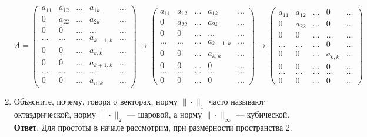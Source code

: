 \documentclass{article}
\begin{document}
\begin{enumerate}
	
	\[
	A = \begin{pmatrix}
		a_{11} & a_{12} & \ldots & a_{1k} & \ldots \\
		0 & a_{22} & \ldots & a_{2k} & \ldots \\
		0 & 0 & \ldots & \ldots & \ldots \\
		\ldots & \ldots & \ldots & a_{k-1,k} & \ldots \\
		0 & 0 &  \ldots & a_{k,k} & \ldots \\
		0 & 0 & \ldots & a_{k+1, k} & \ldots \\
		\ldots & \ldots & \ldots & \ldots & \ldots \\
		0 & 0 & \ldots & a_{n,k} & \ldots
	\end{pmatrix}
	\rightarrow
	\begin{pmatrix}
		a_{11} & a_{12} & \ldots & a_{1k} & \ldots \\
		0 & a_{22} & \ldots & a_{2k} & \ldots \\
		0 & 0 & \ldots & \ldots & \ldots \\
		\ldots & \ldots & \ldots & a_{k-1,k} & \ldots \\
		0 & 0 &  \ldots & a_{k,k} & \ldots \\
		0 & 0 & \ldots & 0 & \ldots \\
		\ldots & \ldots & \ldots & \ldots & \ldots \\
		0 & 0 & \ldots & 0 & \ldots
	\end{pmatrix}
	\rightarrow
	\begin{pmatrix}
		a_{11} & a_{12} & \ldots & 0 & \ldots \\
		0 & a_{22} & \ldots & 0 & \ldots \\
		0 & 0 & \ldots & \ldots & \ldots \\
		\ldots & \ldots & \ldots & 0 & \ldots \\
		0 & 0 &  \ldots & a_{k,k} & \ldots \\
		0 & 0 & \ldots & 0 & \ldots \\
		\ldots & \ldots & \ldots & \ldots & \ldots \\
		0 & 0 & \ldots & 0 & \ldots
	\end{pmatrix}
	\]
    \item Объясните, почему, говоря о векторах, норму $\|\cdot\|_1$ часто
    называют октаэдрической, норму $\|\cdot\|_2$ — шаровой, а норму
    $\|\cdot\|_\infty$ — кубической.
    \newline
    {\bfseries Ответ}.
    Для простоты в начале рассмотрим, при размерности пространства 2.
	

\end{enumerate}
\end{document}
